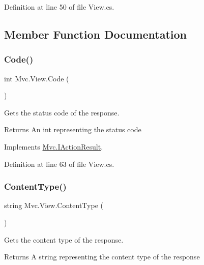 Definition at line 50 of file View.\+cs.



\subsection{Member Function Documentation}
\mbox{\label{class_mvc_1_1_view_a7e723a9bafb2f876175d1396c06da062}} 
\subsubsection{\texorpdfstring{Code()}{Code()}}
{\footnotesize\ttfamily int Mvc.\+View.\+Code (\begin{DoxyParamCaption}{ }\end{DoxyParamCaption})}



Gets the status code of the response. 

\begin{DoxyReturn}{Returns}
An int representing the status code
\end{DoxyReturn}


Implements \hyperlink{interface_mvc_1_1_i_action_result_ab6b85ae50597587395df99b972c3d26b}{Mvc.\+I\+Action\+Result}.



Definition at line 63 of file View.\+cs.

\mbox{\label{class_mvc_1_1_view_a0b14b3b8e85c97ada45a32dfcc30f157}} 
\subsubsection{\texorpdfstring{Content\+Type()}{ContentType()}}
{\footnotesize\ttfamily string Mvc.\+View.\+Content\+Type (\begin{DoxyParamCaption}{ }\end{DoxyParamCaption})}



Gets the content type of the response. 

\begin{DoxyReturn}{Returns}
A string representing the content type of the response
\end{DoxyReturn}


